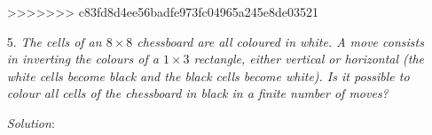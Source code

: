\documentclass{article}
\begin{document}
\begin{enumerate}[1.]
>>>>>>> c83fd8d4ee56badfe973fc04965a245e8de03521

\item[5.] %
\textit{The cells of an $8 \times 8$ chessboard are all coloured in white. A move consists in inverting the colours of a $1 \times 3$ rectangle, either vertical or horizontal (the white cells become black and the black cells become white).
Is it possible to colour all cells of the chessboard in black in a finite number of moves?}

\textit{Solution}: 


\end{enumerate}
\end{document}
